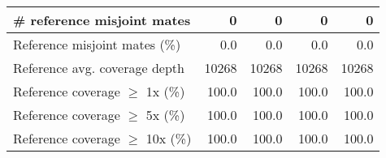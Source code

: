 \documentclass[12pt,a4paper]{article}
\begin{document}
\begin{table}[ht]
\begin{center}
\begin{tabular}{|l*{4}{|r}|}
\# reference misjoint mates & 0 & 0 & 0 & 0 \\ \hline
Reference misjoint mates (\%) & 0.0 & 0.0 & 0.0 & 0.0 \\ \hline
Reference avg. coverage depth & 10268 & 10268 & 10268 & 10268 \\ \hline
Reference coverage $\geq$ 1x (\%) & 100.0 & 100.0 & 100.0 & 100.0 \\ \hline
Reference coverage $\geq$ 5x (\%) & 100.0 & 100.0 & 100.0 & 100.0 \\ \hline
Reference coverage $\geq$ 10x (\%) & 100.0 & 100.0 & 100.0 & 100.0 \\ \hline
\end{tabular}
\end{center}
\end{table}
\end{document}
